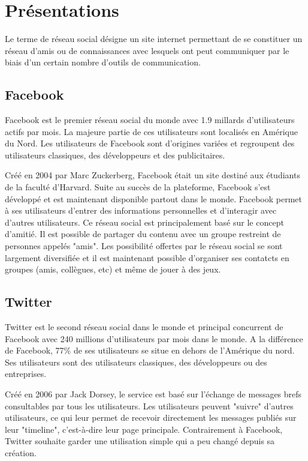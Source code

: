 \documentclass[a4paper,10pt]{article}
\begin{document}
\newpage
\section{Présentations}
Le terme de réseau social désigne un site internet permettant de se constituer un réseau d'amis ou de connaissances avec lesquels ont peut communiquer par le biais d'un certain nombre d'outils de communication.



\subsection{Facebook}
Facebook est le premier réseau social du monde avec 1.9 millards d'utilisateurs actifs par mois. La majeure partie de ces utilisateurs sont localisés en Amérique du Nord. Les utilisateurs de Facebook sont d'origines variées et regroupent des utilisateurs classiques, des développeurs et des publicitaires.


Créé en 2004 par Marc Zuckerberg, Facebook était un site destiné aux étudiants de la faculté d'Harvard. Suite au succès de la plateforme, Facebook s'est développé et est maintenant disponible partout dans le monde. Facebook permet à ses utilisateurs d'entrer des informations personnelles et d’interagir avec d'autres utilisateurs. Ce réseau social est principalement basé sur le concept d'amitié. Il est possible de partager du contenu avec un groupe restreint de personnes appelés "amis".
Les possibilité offertes par le réseau social se sont largement diversifiée et il est maintenant possible d'organiser ses contatcts en groupes (amis, collègues, etc) et même de jouer à des jeux.



\subsection{Twitter}

Twitter est le second réseau social dans le monde et principal concurrent de Facebook avec 240 millions d'utilisateurs par mois dans le monde. A la différence de Facebook, 77\% de ses utilisateurs se situe en dehors de l’Amérique du nord. Ses utilisateurs sont des utilisateurs classiques, des développeurs ou des entreprises.

Créé en 2006 par Jack Dorsey, le service est basé sur l'échange de messages brefs consultables par tous les utilisateurs. Les utilisateurs peuvent "suivre" d'autres utilisateurs, ce qui leur permet de recevoir directement les messages publiés sur leur "timeline", c'est-à-dire leur page principale. Contrairement à Facebook, Twitter souhaite garder une utilisation simple qui a peu changé depuis sa création. 
\end{document}
